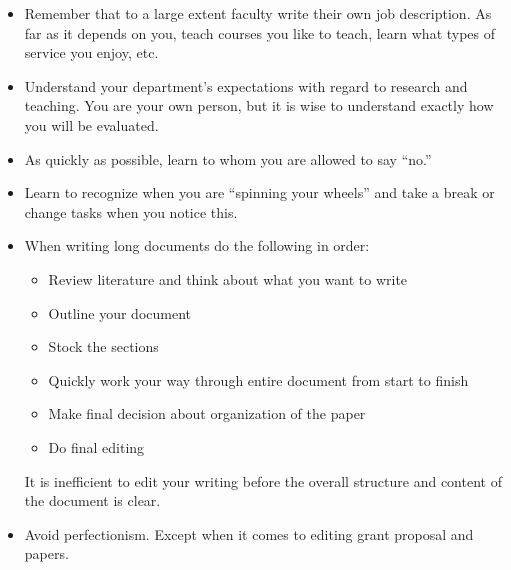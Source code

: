 \begin{itemize}
\item Remember that to a large extent faculty write their own job description.   As far as it depends on you, teach courses you like to teach, learn what types of service you enjoy, etc.  

\item Understand your department's expectations with regard to research and teaching.  You are your own person, but it is wise to understand exactly how you will be evaluated.  

\item As quickly as possible, learn to whom you are allowed to say ``no.'' 

\item Learn to recognize when you are ``spinning your wheels'' and take a break or change tasks when you notice this.

\item When writing long documents do the following in order:
\begin{itemize}
\item Review literature and think about what you want to write
\item Outline your document
\item Stock the sections
\item Quickly work your way through entire document from start to finish
\item Make final decision about organization of the paper
\item Do final editing 
\end{itemize}
It is inefficient to edit your writing before the overall structure and content of the document is clear. 

\item  Avoid perfectionism.  Except when it comes to editing grant proposal and papers. 



\end{itemize}



